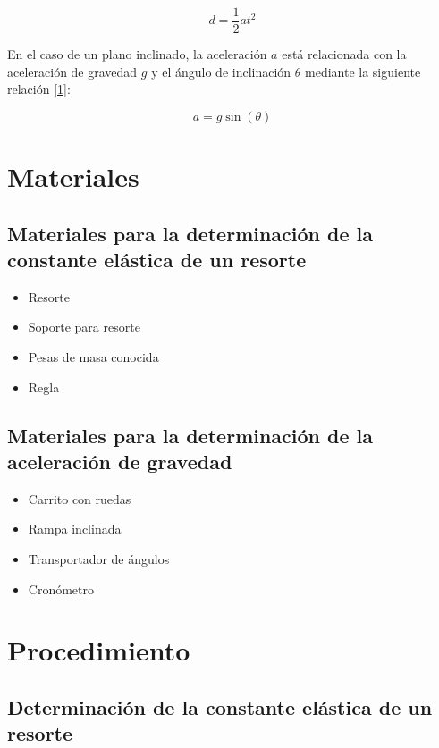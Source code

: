 \documentclass{article}
\begin{document}
\begin{multicols}{2}
            \begin{equation}
                d = \frac{1}{2} a t^2
            \end{equation}

        En el caso de un plano inclinado, la aceleración $a$ está relacionada con la aceleración de 
        gravedad $g$ y el ángulo de inclinación $\theta$ mediante la siguiente relación \ref{1}:

            \begin{equation}
                a = g \sin(\theta)
            \end{equation}

\section{Materiales}

    \subsection{Materiales para la determinación de la constante elástica de un resorte}
    \begin{itemize}
        \item Resorte
        \item Soporte para resorte
        \item Pesas de masa conocida
        \item Regla
    \end{itemize}
    \subsection{Materiales para la determinación de la aceleración de gravedad}
    \begin{itemize}
        \item Carrito con ruedas
        \item Rampa inclinada
        \item Transportador de ángulos
        \item Cronómetro
    \end{itemize}

\section{Procedimiento}

\subsection{Determinación de la constante elástica de un resorte}


\end{multicols}
\end{document}

